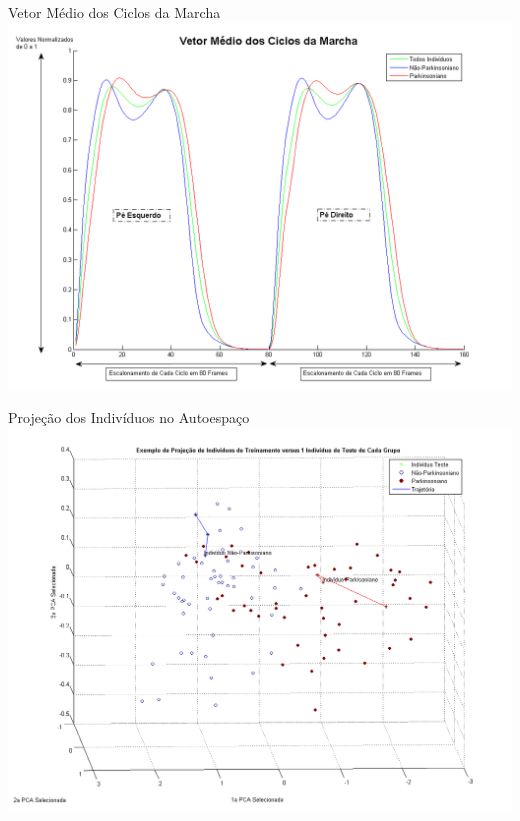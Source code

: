 \documentclass{beamer}
\begin{document}
\begin{frame}{Vetor Médio dos Ciclos da Marcha}
      \center \includegraphics[height=2.6 in]{img/vetormediociclosdamarcha.png}
\end{frame}

\begin{frame}{Projeção dos Indivíduos no Autoespaço}
      \center \includegraphics[height=2.6 in]{img/projecao-pca-parkinson-healthy.png}
\end{frame}
\end{document}
